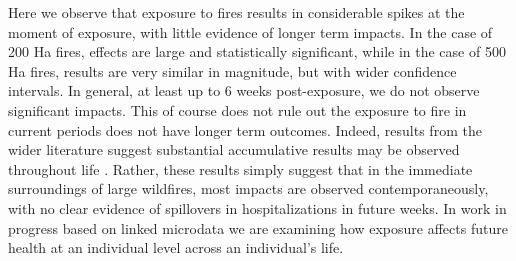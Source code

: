 \documentclass[11pt]{article}
\begin{document}
\begin{spacing}{1.5}
Here we observe that exposure to fires results in considerable spikes at the moment of exposure, with little evidence of longer term impacts.  In the case of 200 Ha fires, effects are large and statistically significant, while in the case of 500 Ha fires, results are very similar in magnitude, but with wider confidence intervals.  In general, at least up to 6 weeks post-exposure, we do not observe significant impacts.  This of course does not rule out the exposure to fire in current periods does not have longer term outcomes.  Indeed, results from the wider literature suggest substantial accumulative results may be observed throughout life \citep{Fulleretal2022,Russetal2021}.  Rather, these results simply suggest that in the immediate surroundings of large wildfires, most impacts are observed contemporaneously, with no clear evidence of spillovers in hospitalizations in future weeks.  In work in progress based on linked microdata we are examining how exposure affects future health at an individual level across an individual's life.   



\end{spacing}
\end{document}
